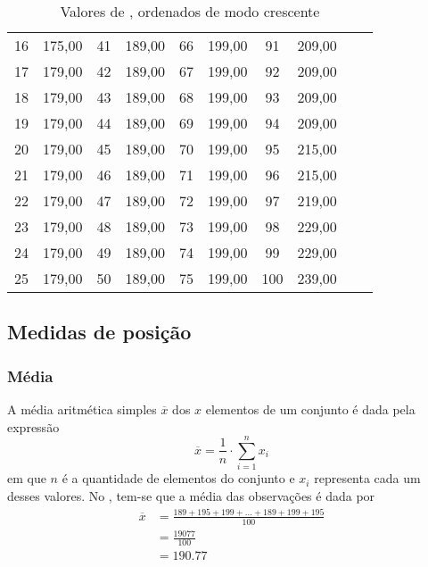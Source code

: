 \begin{table}
\begin{tabular}{cccccccccc}
    16       & 175,00      & 41 & 189,00 & 66 & 199,00 & 91  & 209,00 \\
    17       & 179,00      & 42 & 189,00 & 67 & 199,00 & 92  & 209,00 \\
    18       & 179,00      & 43 & 189,00 & 68 & 199,00 & 93  & 209,00 \\
    19       & 179,00      & 44 & 189,00 & 69 & 199,00 & 94  & 209,00 \\
    20       & 179,00      & 45 & 189,00 & 70 & 199,00 & 95  & 215,00 \\
    21       & 179,00      & 46 & 189,00 & 71 & 199,00 & 96  & 215,00 \\
    22       & 179,00      & 47 & 189,00 & 72 & 199,00 & 97  & 219,00 \\
    23       & 179,00      & 48 & 189,00 & 73 & 199,00 & 98  & 229,00 \\
    24       & 179,00      & 49 & 189,00 & 74 & 199,00 & 99  & 229,00 \\
    25       & 179,00      & 50 & 189,00 & 75 & 199,00 & 100 & 239,00 \\
    \bottomrule
    \end{tabular}
    \caption{Valores de , ordenados de modo crescente}
    \label{tab:medidas-posicao-ordenado}
\end{table}

\subsection{Medidas de posição}%

\subsubsection{Média}
A média aritmética simples $\overline{x}$ dos $x$ elementos de um conjunto é
dada pela expressão
\begin{equation}
    \overline{x} = \frac{1}{n} \cdot \sum_{i=1}^{n} x_i
    \label{eq:media}
\end{equation}
em que $n$ é a quantidade de elementos do conjunto e $x_i$ representa cada
um desses valores. No , tem-se que a média das
observações é dada por
\begin{align*}
    \overline{x} &= \frac{189+195+199 + \ldots + 189+199+195 }{100} \\
                 &= \frac{19077}{100} \\
                 &= 190.77
\end{align*}


